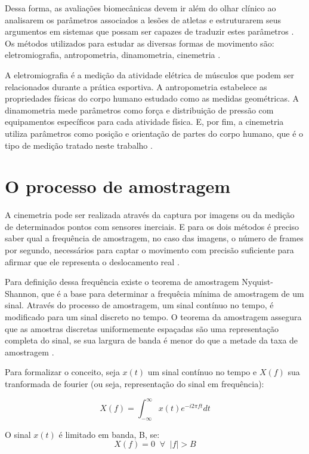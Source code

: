 Dessa forma, as avaliações biomecânicas devem ir além do olhar clínico ao analisarem os parâmetros associados a lesões de atletas e estruturarem seus argumentos em sistemas que possam ser capazes de traduzir estes parâmetros \cite{miziara2014}. Os métodos utilizados para estudar as diversas formas de movimento são: eletromiografia, antropometria, dinamometria, cinemetria \cite{amadio2007}.

A eletromiografia é a medição da atividade elétrica de músculos que podem ser relacionados durante a prática esportiva. A antropometria estabelece as propriedades físicas do corpo humano estudado como as medidas geométricas. A dinamometria mede parâmetros como força e distribuição de pressão com equipamentos específicos para cada atividade física. E, por fim, a cinemetria utiliza parâmetros como posição e orientação de partes do corpo humano, que é o tipo de medição tratado neste trabalho \cite{amadio2007}\cite{medeiros2013}.

\section{O processo de amostragem}
 
A cinemetria pode ser realizada através da captura por imagens ou da medição de determinados pontos com sensores inerciais. E para os dois métodos é preciso saber qual a frequência de amostragem, no caso das imagens, o número de frames por segundo, necessários para captar o movimento com precisão suficiente para afirmar que ele representa o deslocamento real \cite{amadio2007}.

Para definição dessa frequência existe o teorema de amostragem Nyquist-Shannon, que é a base para determinar a frequêcia mínima de amostragem de um sinal. Através do processo de amostragem, um sinal contínuo no tempo, é modificado para um sinal discreto no tempo. O teorema da amostragem assegura que as amostras discretas uniformemente espaçadas são uma representação completa do sinal, se sua largura de banda é menor do que a metade da taxa de amostragem \cite{madeiro2011}.  

Para formalizar o conceito, seja $ x(t) $ um sinal contínuo no tempo e $ X(f) $ sua tranformada de fourier (ou seja, representação do sinal em frequência):

\begin{equation}
 X(f) = \int^{\infty}_{-\infty} x(t)e^{-i2\pi ft}dt 
\end{equation}

O sinal $x(t)$ é limitado em banda, B, se:
\begin{equation}
X(f) = 0 \; \;\forall \; \; |f|>B
\end{equation}

